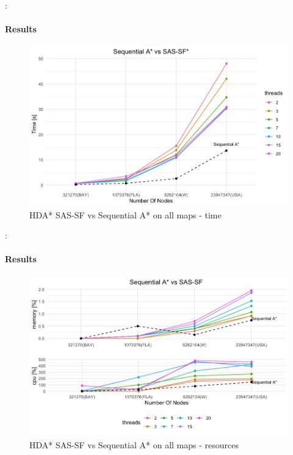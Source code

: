 \documentclass[12pt]{beamer}
\begin{document}
	\begin{frame}{\secname : \subsecname}
		\framesubtitle{Results}
		\begin{figure}[ht!]
			\centering
			\includegraphics[width=0.8\linewidth]{hda/seq_sf_time.png}
			\caption{HDA* SAS-SF vs Sequential A* on all maps - time}
		\end{figure}
	\end{frame}
	\begin{frame}{\secname : \subsecname}
		\framesubtitle{Results}
		\begin{figure}[ht!]
			\centering
			\includegraphics[width=0.8\linewidth]{hda/seq_sf_cpumem.png}
			\caption{HDA* SAS-SF vs Sequential A* on all maps - resources }
		\end{figure}
	\end{frame}
\end{document}

